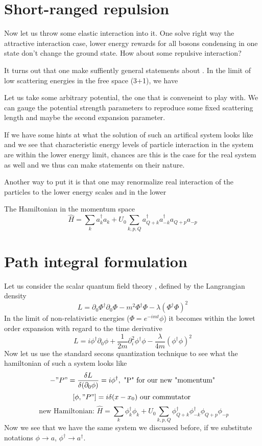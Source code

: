 \documentclass[8pt,letterpaper,notitlepage]{article}
\begin{document}
\section{Short-ranged repulsion}
Now let us throw some elastic interaction into it. One solve right way the attractive interaction case, lower energy rewards for all bosons condensing in one state don't change the ground state. How about some repulsive interaction?

It turns out that one make suffiently general statements about . In the limit of low scattering energies in the free space (3+1), we have 

Let us take some arbitrary potential, the one that is conveneint to play with. We can gauge the potential strength parameters to reproduce some fixed scattering length and maybe the second expansion parameter.

If we have some hints at what the solution of such an artifical system looks like and we see that characteristic energy levels of particle interaction in the system are within the lower energy limit, chances are this is the case for the real system as well and we thus can make statements on their nature.

  Another way to put it is that one may renormalize real interaction of the particles to the lower energy scales and in the lower
 
The Hamiltonian in the momentum space
\begin{equation}
\hat{H} = \sum_{k} a_k^{\dagger} a_k + U_0 \sum_{k,p, Q} a^{\dagger}_{Q +k} a^{\dagger}_{- k} a_{Q+ p} a_{-p}
\end{equation}

\section{Path integral formulation}
Let us consider the scalar quantum field theory \cite{Zee}, defined by the Langrangian density 
\begin{equation}
L = \partial_0 \Phi^{\dagger} \partial_0 \Phi - m^2 \Phi^{\dagger} \Phi - \lambda (\Phi^{\dagger} \Phi)^2
\end{equation}
In the limit of non-relativistic energies ($\Phi = e^{- i m t} \phi $) it becomes within the lowet order expansion with regard to the time derivative
\begin{equation}
L = i \phi^{\dagger} \partial_0 \phi + \frac{1}{2m} \partial_i^2 \phi^{\dagger} \phi - \frac{\lambda}{4 m} (\phi^{\dagger} \phi)^2
\label{langrangian}
\end{equation}
Now let us use the standard secons quantization technique to see what the hamiltonian of such a system looks like
\[
-"P" = \frac{\delta L}{\delta (\partial_0 \phi)} = i \phi^{\dagger}, \text{  "P" for our new "momentum"}
\]
\[
[\phi , "P"] = i \delta(x - x_0) \textrm{  our commutator }
\]
\[
\textrm{ new Hamiltonian: } 
\hat{H} = \sum_{k} \phi_k^{\dagger} \phi_k + U_0 \sum_{k,p, Q} \phi^{\dagger}_{Q +k} \phi^{\dagger}_{- k} \phi_{Q+ p} \phi_{-p}
\]
Now we see that we have the same system we discussed before, if we substitute notations $\phi \rightarrow a$, $\phi^{\dagger} \rightarrow a^{\dagger}$.
\end{document}
